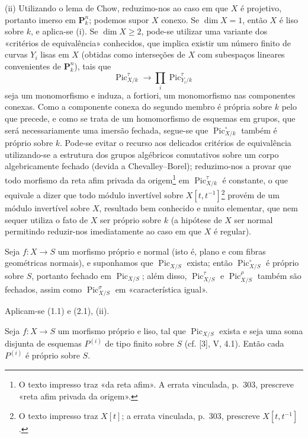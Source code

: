 (ii) Utilizando o lema de Chow, reduzimo-nos ao caso em que $X$ é projetivo,
portanto imerso em $\mathbf P_k^n$; podemos supor $X$ conexo. Se $\dim X=1$,
então $X$ é liso sobre $k$, e aplica-se (i). Se
$\dim X\geq2$, pode-se utilizar uma variante dos «critérios de equivalência»
conhecidos, que implica existir um número finito de curvas $Y_i$ lisas em $X$
(obtidas como interseções de $X$ com subespaços lineares convenientes de
$\mathbf P_k^n$), tais que
\[
\operatorname{Pic}_{X/k}^\tau\longrightarrow
\prod_i\operatorname{Pic}_{Y_i/k}^\tau
\]
seja um monomorfismo e induza, a fortiori, um monomorfismo nas componentes
conexas. Como a componente conexa do segundo membro é própria sobre $k$ pelo
que precede, e como se trata de um homomorfismo de esquemas em grupos, que será
necessariamente uma imersão fechada, segue-se que
$\operatorname{Pic}_{X/k}^\circ$ também é próprio sobre $k$. Pode-se evitar o
recurso aos delicados critérios de equivalência utilizando-se a estrutura dos
grupos algébricos comutativos sobre um corpo algebricamente fechado (devida a
Chevalley--Borel); reduzimo-nos a provar que todo morfismo da reta afim privada
da origem\footnote{O texto impresso traz «da reta afim». A errata vinculada,
p.~303, prescreve «reta afim privada da origem».} em
$\operatorname{Pic}_{X/k}^\tau$ é constante, o que equivale a dizer que todo
módulo invertível sobre $X[t,t^{-1}]$\footnote{O texto impresso traz $X[t]$; a
errata vinculada, p.~303, prescreve $X[t,t^{-1}]$.} provém de um módulo
invertível sobre $X$, resultado bem conhecido e muito elementar, que nem sequer
utiliza o fato de $X$ ser próprio sobre $k$ (a hipótese de $X$ ser normal
permitindo reduzir-nos imediatamente ao caso em que $X$ é regular).

 Seja $f:X\longrightarrow S$ um morfismo próprio e
normal (isto é, plano e com fibras geométricas normais), e suponhamos que
$\operatorname{Pic}_{X/S}$ exista; então $\operatorname{Pic}_{X/S}^\circ$ é
próprio sobre $S$, portanto fechado em $\operatorname{Pic}_{X/S}$; além disso,
$\operatorname{Pic}_{X/S}^\tau$ e $\operatorname{Pic}_{X/S}^\rho$ também são
fechados, assim como $\operatorname{Pic}_{X/S}^\sigma$ em «característica
igual».

Aplicam-se (1.1) e (2.1), (ii).

 Seja $f:X\longrightarrow S$ um morfismo próprio e liso,
tal que $\operatorname{Pic}_{X/S}$ exista e seja uma soma disjunta de esquemas
$P^{(i)}$ de tipo finito sobre $S$ (cf. [3], V, 4.1). Então cada $P^{(i)}$ é
próprio sobre $S$.

